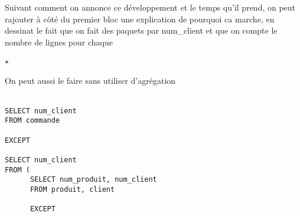 \begin{com}
	Suivant comment on annonce ce développement et le temps qu'il prend, on peut rajouter à côté du premier bloc une explication de pourquoi ca marche, en dessinat le fait que on fait des paquets par num\_client et que on compte le nombre de lignes pour chaque
\end{com}

\paragraph{$\star$} On peut aussi le faire sans utiliser d'agrégation\\
\\
\begin{minipage}{0.5\linewidth}
\begin{lstlisting}
SELECT num_client
FROM commande

EXCEPT

SELECT num_client
FROM (
      SELECT num_produit, num_client
      FROM produit, client
      
      EXCEPT
      

\end{lstlisting}
\end{minipage}
